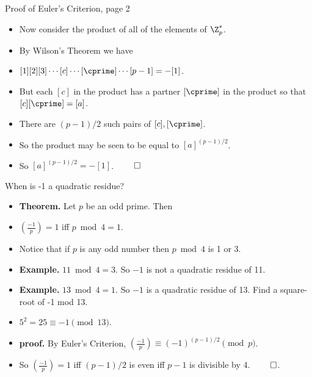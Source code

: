 \documentclass{beamer}
\begin{document}
\begin{frame}{Proof of Euler's Criterion, page 2}

\begin{itemize}
  \item Now consider the product of all of the elements of $\Z^*_p$.
  \item By Wilson's Theorem we have
  \item $[1][2][3]\cdots[c]\cdots[\cprime]\cdots[p-1] = -[1]$.
  \item But each $[c]$ in the product has a partner $[\cprime]$ in the product
  so that $[c][\cprime] = [a]$.
  \item There are $(p-1)/2$ such pairs of $[c], [\cprime]$.
  \item So the product may be seen to be equal to $[a]^{(p-1)/2}$.
  \item So $[a]^{(p-1)/2}= -[1]$. $\qed$
\end{itemize}

\end{frame}

\begin{frame}{When is -1 a quadratic residue?}

\begin{itemize}
  \item \textbf{Theorem.}  Let $p$ be an odd prime. Then
  \item $(\frac{-1}{p}) = 1$ iff $p\bmod 4 = 1$.
  \item Notice that if $p$ is any odd number then $p \bmod 4$ is 1 or 3.
  \item \textbf{Example.} $11\bmod 4 = 3$. So $-1$ is not a quadratic residue of 11.
  \item \textbf{Example.} $13\bmod 4 = 1$. So $-1$ is a quadratic residue of 13. Find a square-root of -1 mod 13.
  \item $5^2 = 25 \equiv -1 \pmod {13}$.
  \item \textbf{proof.} By Euler's Criterion, $(\frac{-1}{p}) \equiv (-1)^{(p-1)/2} \pmod p$.
  \item So $(\frac{-1}{p}) = 1$ iff $(p-1)/2$ is even iff $p-1$ is divisible by 4. $\qed$.
\end{itemize}

\end{frame}
\end{document}
